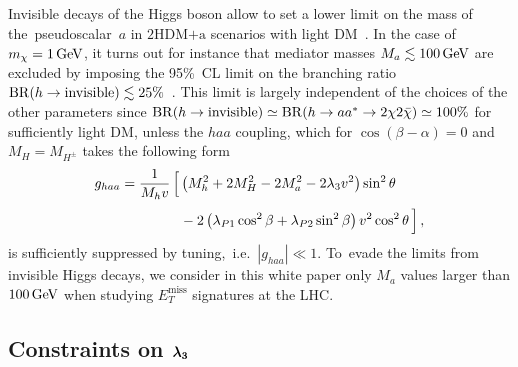 \documentclass[a4paper, 11pt,notoc]{article}
\newcommand{\MET}{\ensuremath{E_T^\mathrm{miss}}\xspace}
\newcommand{\hdma}{\ensuremath{\textrm{2HDM+a}}\xspace}
\def\bm#1{\mbox{\boldmath$#1$\unboldmath}}
\begin{document}
Invisible decays of the Higgs boson allow to set a lower limit on the mass of  the~pseudoscalar~$a$ in \hdma scenarios with light DM~\cite{Bauer:2017ota}. In the case of $m_\chi = 1 \, {\rm GeV}$, it turns out for instance that mediator masses $M_a \lesssim 100 \, {\rm GeV}$ are excluded by imposing the 95\%~CL limit on the branching ratio ${\rm BR} (h \to  \text{invisible}) \lesssim 25\%$~\cite{Aad:2015pla,Khachatryan:2016whc}.  This limit is largely independent of the choices of the other parameters since ${\rm BR} (h \to  \text{invisible}) \simeq {\rm BR} (h \to a a^\ast \to 2 \chi 2 \bar \chi) \simeq 100\%$ for sufficiently light DM, unless  the $haa$ coupling, which for $\cos (\beta-\alpha) = 0$ and $M_H = M_{H^\pm}$ takes the following form~\cite{Bauer:2017ota}
\begin{equation}
\begin{split}
g_{haa} & = \frac{1}{M_h v}  \, \Big [ \left ( M_h^2  + 2 M_H^2  -  2 M_a^2 - 2 \lambda_3 v^2 \right) \sin^2 \theta \\[1mm] &  \hspace{1.5cm} - 2 \left (  \lambda_{P1} \cos^2 \beta + \lambda_{P2} \sin^2 \beta  \right ) v^2 \cos^2 \theta \, \Big ]  \,, 
\end{split}
\end{equation}
is sufficiently suppressed by tuning,~i.e.~$|g_{haa}| \ll 1$. To~evade the limits from invisible Higgs decays, we consider in this white paper only $M_a$ values larger than $100 \, {\rm GeV}$ when studying $\MET$ signatures at the LHC. 

\subsection[Constraints on $\lambda_3$]{Constraints on $\bm{\lambda_3}$}
\end{document}
